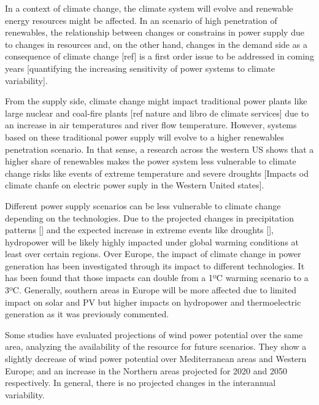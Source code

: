     
In a context of climate change, the climate system will evolve and renewable energy resources might be affected. In an scenario of high penetration of renewables, the relationship between changes or constrains in power supply due to changes in resources and, on the other hand, changes in the demand side as a consequence of climate change [ref] is a first order issue to be addressed in coming years [quantifying the increasing  sensitivity of power systems to climate variability].

From the supply side, climate change might impact traditional power plants like large nuclear and coal-fire plants [ref nature and libro de climate services] due to an increase in air temperatures and river flow temperature. However, systems based on these traditional power supply will evolve to a higher renewables penetration scenario. In that sense, a research across the western US shows that a higher share of renewables makes the power system less vulnerable to climate change risks like events of extreme temperature and severe droughts [Impacts od climate chanfe on electric power suply in the Western United states].  

Different power supply scenarios can be less vulnerable to climate change depending on the technologies. Due to the projected changes in precipitation patterns [] and the expected increase in extreme events like droughts [], hydropower will be likely highly impacted under global warming conditions at least over certain regions. Over Europe, the impact of climate change in power generation has been investigated through its impact to different technologies. It has been found that those impacts can double from a 1ºC warming scenario to a 3ºC. Generally, southern areas in Europe will be more affected due to limited impact on solar and PV but higher impacts on hydropower and thermoelectric generation \cite*{Tobin2018} as it was previously commented.

Some studies have evaluated projections of wind power potential over the same area, analyzing the availability of the resource for future scenarios. They show a slightly decrease of wind power potential over Mediterranean areas and Western Europe; and an increase in the Northern areas \cite*{Tobin2015, Tobin2016} projected for 2020 and 2050 respectively. In general, there is no projected changes in the interannual variability.


